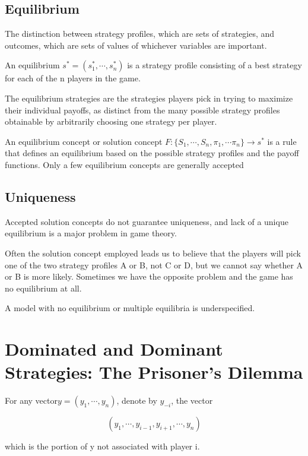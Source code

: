 \documentclass{article}
\begin{document}
\subsection{Equilibrium}

The distinction between strategy profiles, which are sets of strategies, and outcomes, which
are sets of values of whichever variables are important.

An equilibrium $ s^*=(s^*_1,\cdots,s^*_n) $ is a strategy profile consisting of a best strategy for each
of the n players in the game.


The equilibrium strategies are the strategies players pick in trying to maximize
their individual payoffs, as distinct from the many possible strategy profiles obtainable
by arbitrarily choosing one strategy per player.

An equilibrium concept or solution concept $ F:\{S_1,\cdots,S_n,\pi_1,\cdots\pi_n\}\rightarrow s^* $ is a rule
that defines an equilibrium based on the possible strategy profiles and the payoff functions.
Only a few
equilibrium concepts are generally accepted


\subsection{Uniqueness}

Accepted solution concepts do not guarantee uniqueness, and lack of a unique equilibrium
is a major problem in game theory.

Often the solution concept employed leads us to believe
that the players will pick one of the two strategy profiles A or B, not C or D, but we cannot
say whether A or B is more likely. Sometimes we have the opposite problem and the game
has no equilibrium at all.

A model with no equilibrium or multiple equilibria is underspecified.

\section{Dominated and Dominant Strategies: The Prisoner’s Dilemma}

For any vector$ y=(y_1,\cdots,y_n) $, denote by $ y_{-i}  $,  the vector 

\[
  (y_1,\cdots,y_{i-1},y_{i+1},\cdots,y_n) 
\]

which is the portion of y not associated with player i.

\hspace*{\fill}
\end{document}
